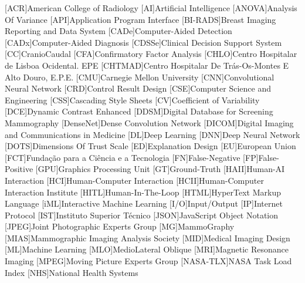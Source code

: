 
\begin{acronym}[H.264/SVC]
[ACR]{American College of Radiology}
[AI]{Artificial Intelligence}
[ANOVA]{Analysis Of Variance}
[API]{Application Program Interface}
[BI-RADS]{Breast Imaging Reporting and Data System}
[CADe]{Computer-Aided Detection}
[CADx]{Computer-Aided Diagnosis}
[CDSSe]{Clinical Decision Support System}
[CC]{CranioCaudal}
[CFA]{Confirmatory Factor Analysis}
[CHLO]{Centro Hospitalar de Lisboa Ocidental. EPE}
[CHTMAD]{Centro Hospitalar De Tr\'{a}s-Os-Montes E Alto Douro, E.P.E.}
[CMU]{Carnegie Mellon University}
[CNN]{Convolutional Neural Network}
[CRD]{Control Result Design}
[CSE]{Computer Science and Engineering}
[CSS]{Cascading Style Sheets}
[CV]{Coefficient of Variability}
[DCE]{Dynamic Contrast Enhanced}
[DDSM]{Digital Database for Screening Mammography}
[DenseNet]{Dense Convolution Network}
[DICOM]{Digital Imaging and Communications in Medicine}
[DL]{Deep Learning}
[DNN]{Deep Neural Network}
[DOTS]{Dimensions Of Trust Scale}
[ED]{Explanation Design}
[EU]{European Union}
[FCT]{Funda\c{c}\~{a}o para a Ci\^{e}ncia e a Tecnologia}
[FN]{False-Negative}
[FP]{False-Positive}
[GPU]{Graphics Processing Unit}
[GT]{Ground-Truth}
[HAII]{Human-AI Interaction}
[HCI]{Human-Computer Interaction}
[HCII]{Human-Computer Interaction Institute}
[HITL]{Human-In-The-Loop}
[HTML]{HyperText Markup Language}
[iML]{Interactive Machine Learning}
[I/O]{Input/Output}
[IP]{Internet Protocol}
[IST]{Instituto Superior T\'{e}cnico}
[JSON]{JavaScript Object Notation}
[JPEG]{Joint Photographic Experts Group}
[MG]{MammoGraphy}
[MIAS]{Mammographic Imaging Analysis Society}
[MID]{Medical Imaging Design}
[ML]{Machine Learning}
[MLO]{MedioLateral Oblique}
[MRI]{Magnetic Resonance Imaging}
[MPEG]{Moving Picture Experts Group}
[NASA-TLX]{NASA Task Load Index}
[NHS]{National Health Systems}

\end{acronym}
